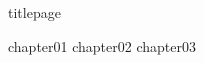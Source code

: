 \documentclass[
	,a4paper
	,12pt
	,oneside
]{book}
\begin{document}
\frontmatter

	{titlepage}
	\tableofcontents

\mainmatter

{chapter01}
{chapter02}
{chapter03}


\backmatter
\end{document}
